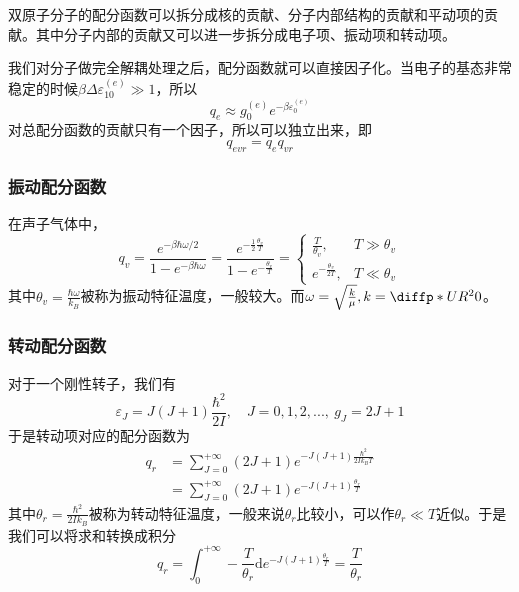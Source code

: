 双原子分子的配分函数可以拆分成核的贡献、分子内部结构的贡献和平动项的贡献。其中分子内部的贡献又可以进一步拆分成电子项、振动项和转动项。

我们对分子做完全解耦处理之后，配分函数就可以直接因子化。当电子的基态非常稳定的时候$\beta\Delta \varepsilon_{10}^{(e)}\gg 1$，所以\begin{equation}
    q_e\approx g_0^{(e)} e^{-\beta \varepsilon_0^{(e)}}
\end{equation}
对总配分函数的贡献只有一个因子，所以可以独立出来，即\begin{equation}
    q_{evr}=q_e q_{vr}
\end{equation}

\subsubsection{振动配分函数}
在声子气体中，\begin{equation}
    q_v =\frac{e^{-\beta \hbar \omega/2}}{1-e^{-\beta \hbar \omega}}=\frac{e^{-\frac12\frac{\theta_v}T}}{1-e^{-\frac{\theta_v}{T}}} =\begin{cases}
        \frac{T}{\theta_v}, & T\gg \theta_v\\
        e^{-\frac{\theta_v}{2T}},& T\ll \theta_v
    \end{cases}
\end{equation}
其中$\displaystyle \theta_v = \frac{\hbar\omega}{k_B}$被称为振动特征温度，一般较大。而$\omega =\sqrt{\frac{k}{\mu}},k=\diffp*{U}{{R^2}}{0}$。
\subsubsection{转动配分函数}
对于一个刚性转子，我们有\begin{equation}
    \varepsilon_J = J(J+1)\frac{\hbar^2}{2I},\quad J=0,1,2,...,\ g_J=2J+1
\end{equation}
于是转动项对应的配分函数为\begin{equation}
    \begin{aligned}
        q_r &= \sum_{J=0}^{+\infty} (2J+1) e^{-J(J+1)\frac{\hbar^2}{2Ik_BT}}\\
        &= \sum_{J=0}^{+\infty} (2J+1) e^{-J(J+1)\frac{\theta_r}{T}}
    \end{aligned}
\end{equation}
其中$\displaystyle \theta_r=\frac{\hbar^2}{2I k_B}$被称为转动特征温度，一般来说$\theta_r$比较小，可以作$\theta_r\ll T$近似。于是我们可以将求和转换成积分\begin{equation}
    q_r=\int_{0}^{+\infty} -\frac{T}{\theta_r}  \mathrm{d} e^{-J(J+1)\frac{\theta_r}{T}}=\frac{T}{\theta_r}
\end{equation}

